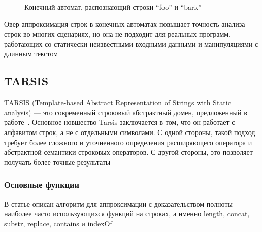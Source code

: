 \begin{figure}[h]
    \centering
    \caption{Конечный автомат, распознающий строки ``foo'' и ``bark''}
\label{fig:automaton}
\end{figure}

Овер-аппроксимация строк в конечных автоматах повышает точность анализа строк во многих сценариях, но она не подходит для реальных программ, работающих со статически неизвестными входными данными и манипуляциями с длинным текстом




\newpage
\subsection{TARSIS}

TARSIS (Template-based Abstract Representation of Strings with Static analysis) — это современный строковый абстрактный домен, предложенный в работе~\cite{tarsis2021}. Основное новшество Tarsis заключается в том, что он работает с алфавитом строк, а не с отдельными символами. С одной стороны, такой подход требует более сложного и уточненного определения расширяющего оператора и абстрактной семантики строковых операторов. С другой стороны, это позволяет получать более точные результаты

\subsubsection*{Основные функции}
В статье описан алгоритм для аппроксимации с доказательством полноты наиболее часто использующихся функций на строках, а именно length, concat, substr, replace, contains и indexOf

